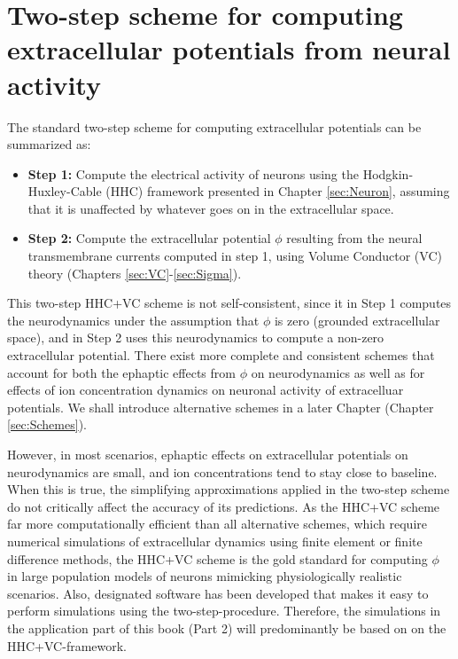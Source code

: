 \section{Two-step scheme for computing extracellular potentials from neural activity}
\label{sec:LFPy}


The standard two-step scheme for computing extracellular potentials can be summarized as: 

\begin{itemize}
\item {\bf Step 1:} Compute the electrical activity of neurons using the Hodgkin-Huxley-Cable (HHC) framework presented in Chapter \ref{sec:Neuron}, assuming that it is unaffected by whatever goes on in the extracellular space. 
\item {\bf Step 2:} Compute the extracellular potential $\phi$ resulting from the neural transmembrane currents computed in step 1, using Volume Conductor (VC) theory (Chapters \ref{sec:VC}-\ref{sec:Sigma}). 
\end{itemize}

This two-step HHC+VC scheme is not self-consistent, since it in Step 1 computes the neurodynamics under the assumption that $\phi$ is zero (grounded extracellular space), and in Step 2 uses this neurodynamics to compute a non-zero extracellular potential. There exist more complete and consistent schemes that account for both the ephaptic effects from $\phi$ on neurodynamics as well as for effects of ion concentration dynamics on neuronal activity of extracelluar potentials. We shall introduce alternative schemes in a later Chapter (Chapter \ref{sec:Schemes}). 

However, in most scenarios, ephaptic effects on extracellular potentials on neurodynamics are small, and ion concentrations tend to stay close to baseline. When this is true, the simplifying approximations applied in the two-step scheme do not critically affect the accuracy of its predictions. As the  HHC+VC scheme far more computationally efficient than all alternative schemes, which require numerical simulations of extracellular dynamics using finite element or finite difference methods,  the HHC+VC scheme is the gold standard for computing $\phi$ in large population models of neurons mimicking physiologically realistic scenarios. Also, designated software has been developed that makes it easy to perform simulations using the two-step-procedure. Therefore, the simulations in the application part of this book (Part 2) will predominantly be based on on the HHC+VC-framework.

